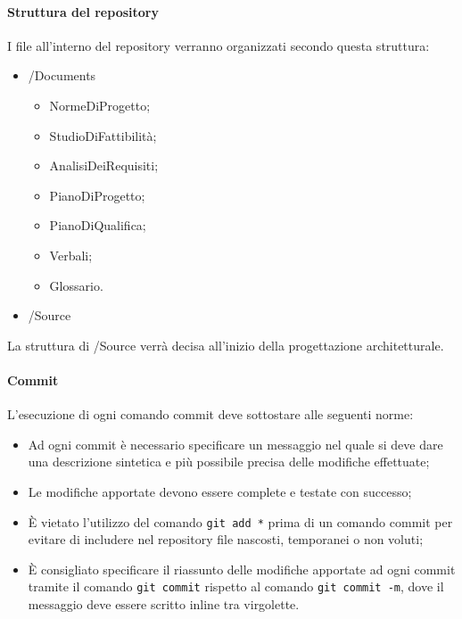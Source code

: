 \documentclass[../NormeProgetto.tex]{subfiles}
\begin{document}
	\paragraph{Struttura del repository}
	I file all'interno del repository verranno organizzati secondo questa struttura:
	\begin{itemize}
		\item /Documents
		\begin{itemize}
			\item NormeDiProgetto;
			\item StudioDiFattibilità;
			\item AnalisiDeiRequisiti;
			\item PianoDiProgetto;
			\item PianoDiQualifica;
			\item Verbali;
			\item Glossario.
		\end{itemize}
		\item /Source
	\end{itemize}
	La struttura di /Source verrà decisa all'inizio della progettazione architetturale.
	\paragraph{Commit}
	L'esecuzione di ogni comando commit deve sottostare alle seguenti norme:
	\begin{itemize}
		\item Ad ogni commit è necessario specificare un messaggio nel quale si deve dare una descrizione sintetica e più possibile precisa delle modifiche effettuate;
		\item Le modifiche apportate devono essere complete e testate con successo;
		\item È vietato l'utilizzo del comando \texttt{git add *} prima di un comando commit per evitare di includere nel repository file nascosti, temporanei o non voluti;
		\item È consigliato specificare il riassunto delle modifiche apportate ad ogni commit tramite il comando \texttt{git commit} rispetto al comando \texttt{git commit -m}, dove il messaggio deve essere scritto inline tra virgolette.
	\end{itemize}	
\end{document}
